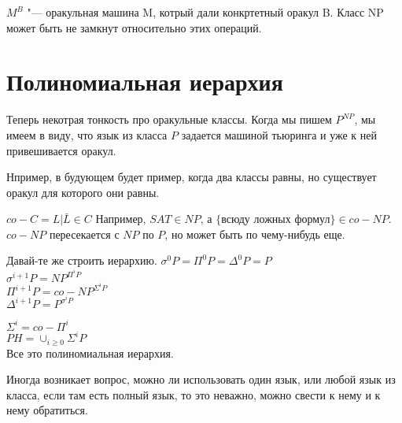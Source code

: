 $M^B$ "--- оракульная машина M, котрый дали конкртетный оракул B. Класс NP может 
быть не замкнут относительно этих операций. 


\section{Полиномиальная иерархия}

Теперь некотрая тонкость про оракульные классы. Когда 
мы пишем $P^{NP}$, мы имеем в виду, что язык из класса 
$P$ задается машиной тьюринга и уже к ней привешивается оракул. 

Нпример, в будующем будет пример, когда два классы равны, но существует оракул
для которого они равны. 
 
$co-C = {L|\bar{L} \in C}$
Например, $SAT \in NP$, а $\{$всюду ложных формул$\} \in co-NP$.\\

$co-NP$ пересекается с $NP$ по $P$, но может быть по чему-нибудь еще. 

Давай-те же строить иерархию.
$\sigma^0P = \Pi^0P = \Delta^0P = P$\\
$\sigma^{i + 1}P = NP^{\Pi^iP}$\\
$\Pi^{i + 1}P = co-NP^{\Sigma^iP}$\\
$\Delta^{i + 1}P = P^{\sigma^iP}$

$\Sigma^{i} = co-\Pi^{i}$\\

$PH = \cup_{i \ge 0}\Sigma^{i}P$ \\

Все это полиномиальная иерархия. 

Иногда возникает вопрос, можно ли использовать один язык, или 
любой язык из класса, если там есть полный язык, то это неважно, 
можно свести к нему и к нему обратиться. 

